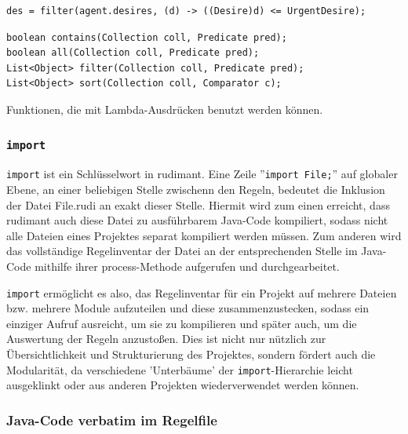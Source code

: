 \begin{verbatim}
des = filter(agent.desires, (d) -> ((Desire)d) <= UrgentDesire);
\end{verbatim}


\begin{table}[htbp]
  \centering
  \begin{small}
\begin{verbatim}
boolean contains(Collection coll, Predicate pred);
boolean all(Collection coll, Predicate pred);
List<Object> filter(Collection coll, Predicate pred);
List<Object> sort(Collection coll, Comparator c);
\end{verbatim}
  \end{small}

  \caption{Funktionen, die mit Lambda-Ausdrücken benutzt werden können.}
  \label{tab:lambda-functions}
\end{table}

\subsubsection{\texttt{import}}

\texttt{import} ist ein Schlüsselwort in rudimant. Eine Zeile ''\texttt{import
  File;}'' auf globaler Ebene, an einer beliebigen Stelle zwischenn den Regeln,
bedeutet die Inklusion der Datei File.rudi an exakt dieser Stelle. Hiermit wird
zum einen erreicht, dass rudimant auch diese Datei zu ausführbarem Java-Code
kompiliert, sodass nicht alle Dateien eines Projektes separat kompiliert werden
müssen. Zum anderen wird das vollständige Regelinventar der Datei an der
entsprechenden Stelle im Java-Code mithilfe ihrer process-Methode aufgerufen
und durchgearbeitet.

\texttt{import} ermöglicht es also, das Regelinventar für ein Projekt auf
mehrere Dateien bzw. mehrere Module aufzuteilen und diese zusammenzustecken,
sodass ein einziger Aufruf ausreicht, um sie zu kompilieren und später auch, um
die Auswertung der Regeln anzustoßen. Dies ist nicht nur nützlich zur
Übersichtlichkeit und Strukturierung des Projektes, sondern fördert auch die
Modularität, da verschiedene 'Unterbäume' der \texttt{import}-Hierarchie leicht
ausgeklinkt oder aus anderen Projekten wiederverwendet werden können.

\subsubsection{Java-Code verbatim im Regelfile} \label{rudi-verbatim}

